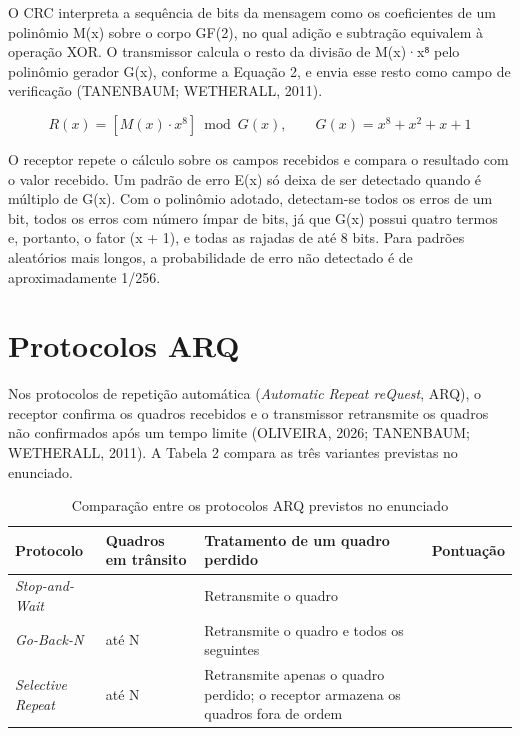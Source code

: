 \documentclass[12pt, oneside, a4paper, sumario=tradicional, chapter=TITLE, brazilian]{abntex2}
\renewcommand{\arraystretch}{1.3}
\begin{document}
O CRC interpreta a sequência de bits da mensagem como os coeficientes de um polinômio M(x) sobre o corpo GF(2), no qual adição e subtração equivalem à operação XOR. O transmissor calcula o resto da divisão de M(x)·x⁸ pelo polinômio gerador G(x), conforme a Equação 2, e envia esse resto como campo de verificação (TANENBAUM; WETHERALL, 2011).

\begin{equation}
  R(x) = \left[ M(x)\cdot x^{8} \right] \bmod G(x), \qquad G(x) = x^{8} + x^{2} + x + 1
\end{equation}

O receptor repete o cálculo sobre os campos recebidos e compara o resultado com o valor recebido. Um padrão de erro E(x) só deixa de ser detectado quando é múltiplo de G(x). Com o polinômio adotado, detectam-se todos os erros de um bit, todos os erros com número ímpar de bits, já que G(x) possui quatro termos e, portanto, o fator (x + 1), e todas as rajadas de até 8 bits. Para padrões aleatórios mais longos, a probabilidade de erro não detectado é de aproximadamente 1/256.

\section{Protocolos ARQ}

Nos protocolos de repetição automática (\textit{Automatic Repeat reQuest}, ARQ), o receptor confirma os quadros recebidos e o transmissor retransmite os quadros não confirmados após um tempo limite (OLIVEIRA, 2026; TANENBAUM; WETHERALL, 2011). A Tabela 2 compara as três variantes previstas no enunciado.

\begin{table}[H]
  \centering
  \caption{Comparação entre os protocolos ARQ previstos no enunciado}
  \small\renewcommand{\arraystretch}{1.3}
  \begin{tabular}{|>{\raggedright\arraybackslash}m{3.02cm}|>{\centering\arraybackslash}m{2.66cm}|>{\centering\arraybackslash}m{6.57cm}|>{\centering\arraybackslash}m{1.95cm}|}
  \hline
  \rowcolor{gray!22}\textbf{Protocolo} & \textbf{Quadros em trânsito} & \textbf{Tratamento de um quadro perdido} & \textbf{Pontuação} \\ \hline
  \textit{Stop-and-Wait} & 1 & Retransmite o quadro & 1 \\ \hline
  \textit{Go-Back-N} & até N & Retransmite o quadro e todos os seguintes & 2 \\ \hline
  \textit{Selective Repeat} & até N & Retransmite apenas o quadro perdido; o receptor armazena os quadros fora de ordem & 3 \\ \hline
  \end{tabular}
\end{table}
\end{document}
